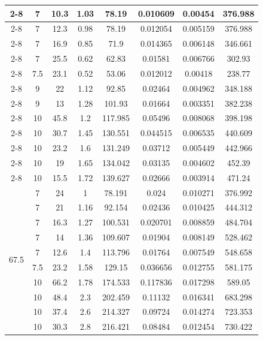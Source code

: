 \documentclass[10pt]{IEEEtran}
\begin{document}
\begin{table}[ht!]
\begin{tabular}{|c|c|c|c|c|c|c|c|}
    \cline{2-8}
    & 7 & 10.3 & 1.03 & 78.19 & 0.010609 & 0.00454 & 376.988 \\
    \cline{2-8}
    & 7 & 12.3 & 0.98 & 78.19 & 0.012054 & 0.005159 & 376.988 \\
    \cline{2-8}
    & 7 & 16.9 & 0.85 & 71.9 & 0.014365 & 0.006148 & 346.661 \\
    \cline{2-8}
    & 7 & 25.5 & 0.62 & 62.83 & 0.01581 & 0.006766 & 302.93 \\
    \cline{2-8}
    & 7.5 & 23.1 & 0.52 & 53.06 & 0.012012 & 0.00418 & 238.77 \\
    \cline{2-8}
    & 9 & 22 & 1.12 & 92.85 & 0.02464 & 0.004962 & 348.188 \\
    \cline{2-8}
    & 9 & 13 & 1.28 & 101.93 & 0.01664 & 0.003351 & 382.238 \\
    \cline{2-8}
    & 10 & 45.8 & 1.2 & 117.985 & 0.05496 & 0.008068 & 398.198 \\
    \cline{2-8}
    & 10 & 30.7 & 1.45 & 130.551 & 0.044515 & 0.006535 & 440.609 \\
    \cline{2-8}
    & 10 & 23.2 & 1.6 & 131.249 & 0.03712 & 0.005449 & 442.966 \\
    \cline{2-8}
    & 10 & 19 & 1.65 & 134.042 & 0.03135 & 0.004602 & 452.39 \\
    \cline{2-8}
    & 10 & 15.5 & 1.72 & 139.627 & 0.02666 & 0.003914 & 471.24 \\
    \hline
    \multirow{14}{*}{67.5} & 7 & 24 & 1 & 78.191 & 0.024 & 0.010271 & 376.992 \\
    \cline{2-8}
    & 7 & 21 & 1.16 & 92.154 & 0.02436 & 0.010425 & 444.312 \\
    \cline{2-8}
    & 7 & 16.3 & 1.27 & 100.531 & 0.020701 & 0.008859 & 484.704 \\
    \cline{2-8}
    & 7 & 14 & 1.36 & 109.607 & 0.01904 & 0.008149 & 528.462 \\
    \cline{2-8}
    & 7 & 12.6 & 1.4 & 113.796 & 0.01764 & 0.007549 & 548.658 \\
    \cline{2-8}
    & 7.5 & 23.2 & 1.58 & 129.15 & 0.036656 & 0.012755 & 581.175 \\
    \cline{2-8}
    & 10 & 66.2 & 1.78 & 174.533 & 0.117836 & 0.017298 & 589.05 \\
    \cline{2-8}
    & 10 & 48.4 & 2.3 & 202.459 & 0.11132 & 0.016341 & 683.298 \\
    \cline{2-8}
    & 10 & 37.4 & 2.6 & 214.327 & 0.09724 & 0.014274 & 723.353 \\
    \cline{2-8}
    & 10 & 30.3 & 2.8 & 216.421 & 0.08484 & 0.012454 & 730.422 \\

\end{tabular}
\end{table}
\end{document}
